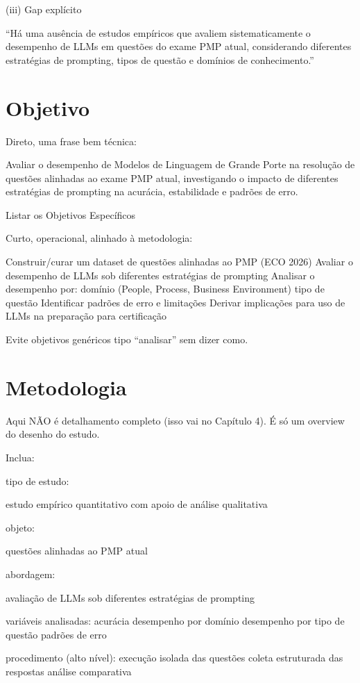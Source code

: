 (iii) Gap explícito

“Há uma ausência de estudos empíricos que avaliem sistematicamente o desempenho de LLMs em questões do exame PMP atual, considerando diferentes estratégias de prompting, tipos de questão e domínios de conhecimento.”




\section{Objetivo}

Direto, uma frase bem técnica:

Avaliar o desempenho de Modelos de Linguagem de Grande Porte na resolução de questões alinhadas ao exame PMP atual, investigando o impacto de diferentes estratégias de prompting na acurácia, estabilidade e padrões de erro.

Listar os Objetivos Específicos

Curto, operacional, alinhado à metodologia:

Construir/curar um dataset de questões alinhadas ao PMP (ECO 2026)
Avaliar o desempenho de LLMs sob diferentes estratégias de prompting
Analisar o desempenho por:
domínio (People, Process, Business Environment)
tipo de questão
Identificar padrões de erro e limitações
Derivar implicações para uso de LLMs na preparação para certificação

Evite objetivos genéricos tipo “analisar” sem dizer como.




\section{Metodologia}
Aqui NÃO é detalhamento completo (isso vai no Capítulo 4).
É só um overview do desenho do estudo.

Inclua:

tipo de estudo:

estudo empírico quantitativo com apoio de análise qualitativa

objeto:

questões alinhadas ao PMP atual

abordagem:

avaliação de LLMs sob diferentes estratégias de prompting

variáveis analisadas:
acurácia
desempenho por domínio
desempenho por tipo de questão
padrões de erro


procedimento (alto nível):
execução isolada das questões
coleta estruturada das respostas
análise comparativa





